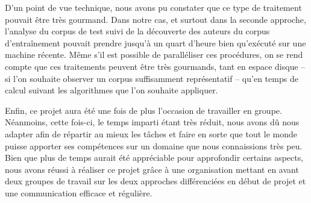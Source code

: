 \documentclass[a4paper,12pt]{report}
\begin{document}
D'un point de vue technique, nous avons pu constater que ce type de traitement pouvait être très gourmand. Dans notre cas, et surtout dans la seconde approche, l'analyse du corpus de test suivi de la découverte des auteurs du corpus d'entraînement pouvait prendre jusqu'à un quart d'heure bien qu'exécuté sur une machine récente. Même s'il est possible de paralléliser ces procédures, on se rend compte que ces traitements peuvent être très gourmands, tant en espace disque -- si l'on souhaite observer un corpus suffisamment représentatif -- qu'en temps de calcul suivant les algorithmes que l'on souhaite appliquer.

Enfin, ce projet aura été une fois de plus l'occasion de travailler en groupe. Néanmoins, cette fois-ci, le temps imparti étant très réduit, nous avons dû nous adapter afin de répartir au mieux les tâches et faire en sorte que tout le monde puisse apporter ses compétences sur un domaine que nous connaissions très peu. Bien que plus de temps aurait été appréciable pour approfondir certains aspects, nous avons réussi à réaliser ce projet grâce à une organisation mettant en avant deux groupes de travail sur les deux approches différenciées en début de projet et une communication efficace et régulière.
\end{document}
